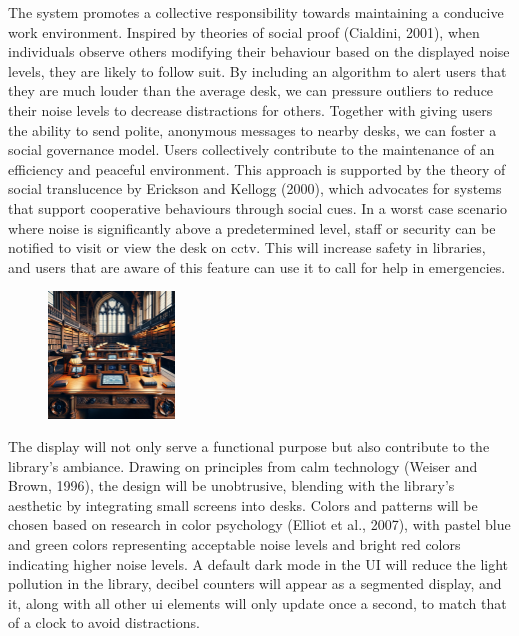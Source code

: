 \documentclass{novel}
\begin{document}
The system promotes a collective responsibility towards maintaining a conducive work environment. Inspired by theories of social proof (Cialdini, 2001), when individuals observe others modifying their behaviour based on the displayed noise levels, they are likely to follow suit. By including an algorithm to alert users that they are much louder than the average desk, we can pressure outliers to reduce their noise levels to decrease distractions for others. Together with giving users the ability to send polite, anonymous messages to nearby desks, we can foster a social governance model. Users collectively contribute to the maintenance of an efficiency and peaceful environment. This approach is supported by the theory of social translucence by Erickson and Kellogg (2000), which advocates for systems that support cooperative behaviours through social cues. In a worst case scenario where noise is significantly above a predetermined level, staff or security can be notified to visit or view the desk on cctv. This will increase safety in libraries, and users that are aware of this feature can use it to call for help in emergencies.

\begin{figure}
\vspace{-\intextsep}
    \includegraphics[width=0.3\textwidth]{resources/deskDevice.jpg}
    \vspace{-20pt} %
\end{figure}
The display will not only serve a functional purpose but also contribute to the library's ambiance. Drawing on principles from calm technology (Weiser and Brown, 1996), the design will be unobtrusive, blending with the library's aesthetic by integrating small screens into desks. Colors and patterns will be chosen based on research in color psychology (Elliot et al., 2007), with pastel blue and green colors representing acceptable noise levels and bright red colors indicating higher noise levels. A default dark mode in the UI will reduce the light pollution in the library, decibel counters will appear as a segmented display, and it, along with all other ui elements will only update once a second, to match that of a clock to avoid distractions.
\end{document}
